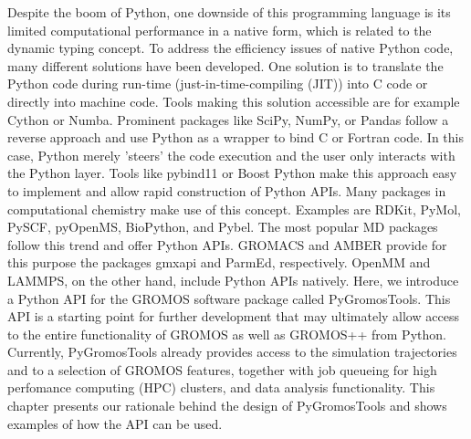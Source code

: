 Despite the boom of Python, one downside of this programming language is its limited computational performance in a native form, which is related to the dynamic typing concept. To address the efficiency issues of native Python code, many different solutions have been developed. One solution is to translate the Python code during run-time (just-in-time-compiling (JIT)) into C code\cite{Kernighan2006} or directly into machine code\cite{Lattner2008}. Tools making this solution accessible are for example Cython\cite{Behnel2011} or Numba\cite{Lam2015}. 
Prominent packages like SciPy\cite{Vanderwalt2011}, NumPy\cite{Virtanen2020}, or Pandas\cite{Mckinney2010} follow a reverse approach and use Python as a wrapper to bind C or Fortran code. In this case, Python merely 'steers' the code execution and the user only interacts with the Python layer.\cite{Oliphant2007} 
Tools like pybind11\cite{Wenzel2017} or Boost Python\cite{Koranne2011} make this approach easy to implement and allow rapid construction of Python APIs. 
Many packages in computational chemistry make use of this concept. Examples are RDKit\cite{Landrum2021}, PyMol\cite{Delano2020}, PySCF\cite{Sun2018}, pyOpenMS\cite{Roest2014}, BioPython\cite{Cock2009}, and Pybel\cite{O'Boyle2008}. The most popular MD packages follow this trend and offer Python APIs. GROMACS \cite{Berendsen1995, Lindahl2001, Abraham2015} and AMBER\cite{Weiner1981, Pearlman1995, Case2005} provide for this purpose the packages gmxapi\cite{Irrgang2018} and ParmEd\cite{Shirts2017}, respectively. OpenMM\cite{Friedrichs2009, Eastman2010, Eastman2017} and LAMMPS,\cite{plimpton1995, Thompson2022} on the other hand, include Python APIs natively.\cite{Talirz2021}
Here, we introduce a Python API for the GROMOS software package \cite{Schmid2012} called PyGromosTools.\cite{Lehner2021} This API is a starting point for further development that may ultimately allow access to the entire functionality of GROMOS as well as GROMOS++ \cite{Eichenberger2011} from Python. Currently, PyGromosTools already provides access to the simulation trajectories and to a selection of GROMOS features, together with job queueing for high perfomance computing (HPC) clusters, and data analysis functionality. This chapter presents our rationale behind the design of PyGromosTools and shows examples of how the API can be used.



\FloatBarrier